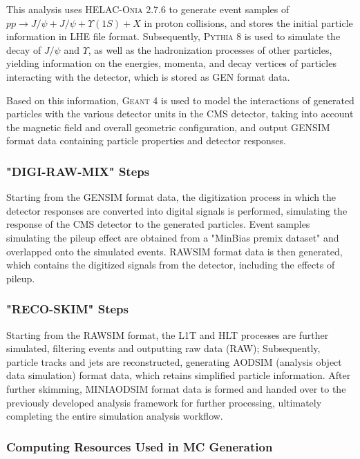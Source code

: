 \documentclass[10pt,twocolumn]{article}
\begin{document}
This analysis uses \textsc{HELAC-Onia 2.7.6} to generate event samples of $pp\to J/\psi+J/\psi+\Upsilon(1S)+X$ in proton collisions, and stores the initial particle information in LHE file format. Subsequently, \textsc{Pythia 8} is used to simulate the decay of $J/\psi$ and $\Upsilon$, as well as the hadronization processes of other particles, yielding information on the  energies, momenta, and decay vertices of particles interacting with the detector, which is stored as GEN format data.

Based on this information, \textsc{Geant 4} is used to model the interactions of generated particles with the various detector units in the CMS detector, taking into account the magnetic field and overall geometric configuration, and output GENSIM format data containing particle properties and detector responses.

\subsubsection{"DIGI-RAW-MIX" Steps}

Starting from the GENSIM format data, the digitization process in which the detector responses are converted into digital signals is performed, simulating the response of the CMS detector to the generated particles. Event samples simulating the pileup effect are obtained from a "MinBias premix dataset" and overlapped onto the simulated events. RAWSIM format data is then generated, which contains the digitized signals from the detector, including the effects of pileup.

\subsubsection{"RECO-SKIM" Steps}

Starting from the RAWSIM format, the L1T and HLT processes are further simulated, filtering events and outputting raw data (RAW); Subsequently, particle tracks and jets are reconstructed, generating AODSIM (analysis object data simulation) format data, which retains simplified particle information. After further skimming, MINIAODSIM format data is formed and handed over to the previously developed analysis framework for further processing, ultimately completing the entire simulation analysis workflow.

\subsubsection{Computing Resources Used in MC Generation}
\end{document}
